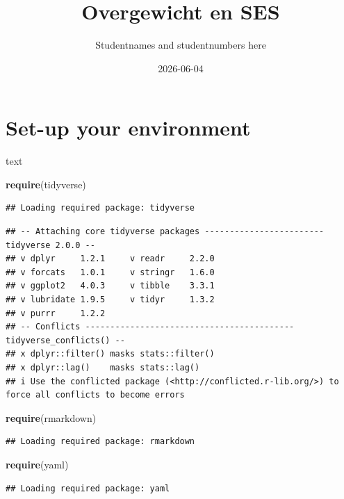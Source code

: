 \documentclass[
]{article}
\title{Overgewicht en SES}
\author{Studentnames and studentnumbers here}
\date{2026-06-04}
\newenvironment{Shaded}{\begin{snugshade}}{\end{snugshade}}
\newcommand{\FunctionTok}[1]{\textcolor[rgb]{0.13,0.29,0.53}{\textbf{#1}}}
\newcommand{\NormalTok}[1]{#1}
\begin{document}
\maketitle

\section{Set-up your environment}\label{set-up-your-environment}

text

\begin{Shaded}
\begin{Highlighting}[]
\FunctionTok{require}\NormalTok{(tidyverse)}
\end{Highlighting}
\end{Shaded}

\begin{verbatim}
## Loading required package: tidyverse
\end{verbatim}

\begin{verbatim}
## -- Attaching core tidyverse packages ------------------------ tidyverse 2.0.0 --
## v dplyr     1.2.1     v readr     2.2.0
## v forcats   1.0.1     v stringr   1.6.0
## v ggplot2   4.0.3     v tibble    3.3.1
## v lubridate 1.9.5     v tidyr     1.3.2
## v purrr     1.2.2     
## -- Conflicts ------------------------------------------ tidyverse_conflicts() --
## x dplyr::filter() masks stats::filter()
## x dplyr::lag()    masks stats::lag()
## i Use the conflicted package (<http://conflicted.r-lib.org/>) to force all conflicts to become errors
\end{verbatim}

\begin{Shaded}
\begin{Highlighting}[]
\FunctionTok{require}\NormalTok{(rmarkdown)}
\end{Highlighting}
\end{Shaded}

\begin{verbatim}
## Loading required package: rmarkdown
\end{verbatim}

\begin{Shaded}
\begin{Highlighting}[]
\FunctionTok{require}\NormalTok{(yaml)}
\end{Highlighting}
\end{Shaded}

\begin{verbatim}
## Loading required package: yaml
\end{verbatim}
\end{document}
